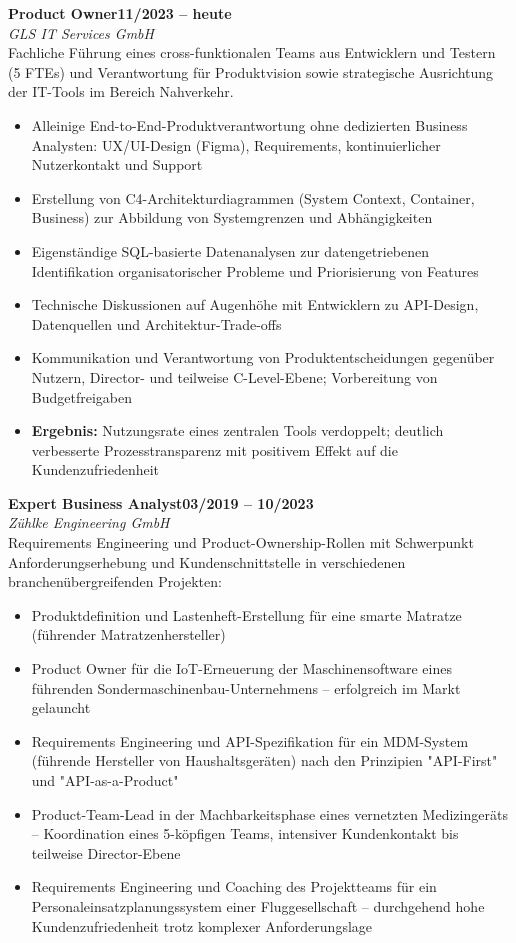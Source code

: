 \documentclass[10.5pt,a4paper]{article}
\newcommand{\cventry}[4]{%
  \needspace{6\baselineskip}%
  \noindent\textbf{\large #2}\hfill{\color{gray}\textbf{\small #1}}\\[1pt]
  {\color{accent}\textit{#3}}\\[3pt]
  #4
  \vspace{5pt}
}
\newenvironment{tightitemize}{
  \begin{itemize}[leftmargin=12pt,itemsep=1pt,topsep=2pt,parsep=0pt,label={\color{accent}\textbullet}]
}{\end{itemize}}
\begin{document}
\cventry{11/2023 -- heute}{Product Owner}{GLS IT Services GmbH}{
Fachliche Führung eines cross-funktionalen Teams aus Entwicklern und Testern (5 FTEs) und Verantwortung für Produktvision sowie strategische Ausrichtung der IT-Tools im Bereich Nahverkehr.
\begin{tightitemize}
  \item Alleinige End-to-End-Produktverantwortung ohne dedizierten Business Analysten: UX/UI-Design (Figma), Requirements, kontinuierlicher Nutzerkontakt und Support
  \item Erstellung von C4-Architekturdiagrammen (System Context, Container, Business) zur Abbildung von Systemgrenzen und Abhängigkeiten
  \item Eigenständige SQL-basierte Datenanalysen zur datengetriebenen Identifikation organisatorischer Probleme und Priorisierung von Features
  \item Technische Diskussionen auf Augenhöhe mit Entwicklern zu API-Design, Datenquellen und Architektur-Trade-offs
  \item Kommunikation und Verantwortung von Produktentscheidungen gegenüber Nutzern, Director- und teilweise C-Level-Ebene; Vorbereitung von Budgetfreigaben
  \item \textbf{Ergebnis:} Nutzungsrate eines zentralen Tools verdoppelt; deutlich verbesserte Prozesstransparenz mit positivem Effekt auf die Kundenzufriedenheit
\end{tightitemize}
}

\cventry{03/2019 -- 10/2023}{Expert Business Analyst}{Zühlke Engineering GmbH}{
Requirements Engineering und Product-Ownership-Rollen mit Schwerpunkt Anforderungserhebung und Kundenschnittstelle in verschiedenen branchenübergreifenden Projekten:
\begin{tightitemize}
  \item Produktdefinition und Lastenheft-Erstellung für eine smarte Matratze (führender Matratzenhersteller)
  \item Product Owner für die IoT-Erneuerung der Maschinensoftware eines führenden Sondermaschinenbau-Unternehmens -- erfolgreich im Markt gelauncht
  \item Requirements Engineering und API-Spezifikation für ein MDM-System (führende Hersteller von Haushaltsgeräten) nach den Prinzipien "API-First" und "API-as-a-Product"
  \item Product-Team-Lead in der Machbarkeitsphase eines vernetzten Medizingeräts -- Koordination eines 5-köpfigen Teams, intensiver Kundenkontakt bis teilweise Director-Ebene
  \item Requirements Engineering und Coaching des Projektteams für ein Personaleinsatzplanungssystem einer Fluggesellschaft -- durchgehend hohe Kundenzufriedenheit trotz komplexer Anforderungslage
\end{tightitemize}
}
\end{document}
